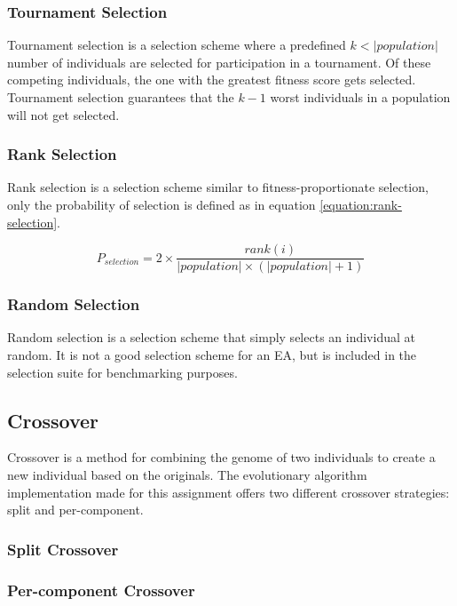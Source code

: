 \documentclass{article}
\begin{document}
\subsubsection{Tournament Selection}

Tournament selection is a selection scheme where a predefined $ k < | population | $ number of individuals are selected for participation in a tournament.
Of these competing individuals, the one with the greatest fitness score gets selected.
Tournament selection guarantees that the $ k - 1 $ worst individuals in a population will not get selected.

\subsubsection{Rank Selection}

Rank selection is a selection scheme similar to fitness-proportionate selection, only the probability of selection is defined as in equation \ref{equation:rank-selection}.

\begin{equation}\label{equation:rank-selection}
P_{selection} = 2 \times
\frac{rank(i)}
{| population | \times (| population | + 1)}
\end{equation}

\subsubsection{Random Selection}
Random selection is a selection scheme that simply selects an individual at random.
It is not a good selection scheme for an EA, but is included in the selection suite for benchmarking purposes.

\subsection{Crossover}
Crossover is a method for combining the genome of two individuals to create a new individual based on the originals.
The evolutionary algorithm implementation made for this assignment offers two different crossover strategies: split and per-component.

\subsubsection{Split Crossover}


\subsubsection{Per-component Crossover}
\end{document}

